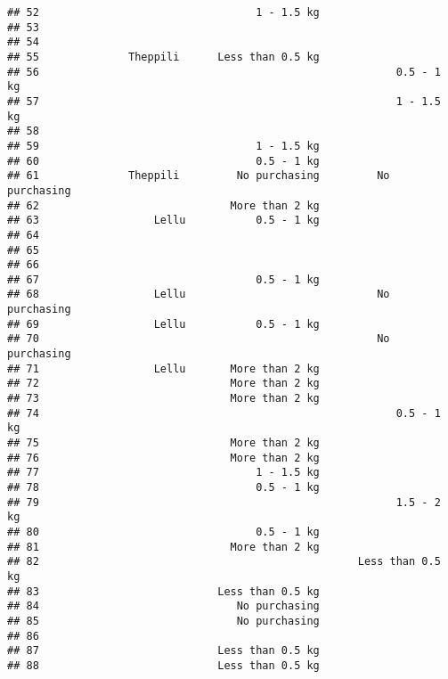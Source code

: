 \documentclass[
]{article}
\begin{document}
\begin{verbatim}
## 52                                  1 - 1.5 kg                      
## 53                                                                  
## 54                                                                  
## 55              Theppili      Less than 0.5 kg                      
## 56                                                        0.5 - 1 kg
## 57                                                        1 - 1.5 kg
## 58                                                                  
## 59                                  1 - 1.5 kg                      
## 60                                  0.5 - 1 kg                      
## 61              Theppili         No purchasing         No purchasing
## 62                              More than 2 kg                      
## 63                  Lellu           0.5 - 1 kg                      
## 64                                                                  
## 65                                                                  
## 66                                                                  
## 67                                  0.5 - 1 kg                      
## 68                  Lellu                              No purchasing
## 69                  Lellu           0.5 - 1 kg                      
## 70                                                     No purchasing
## 71                  Lellu       More than 2 kg                      
## 72                              More than 2 kg                      
## 73                              More than 2 kg                      
## 74                                                        0.5 - 1 kg
## 75                              More than 2 kg                      
## 76                              More than 2 kg                      
## 77                                  1 - 1.5 kg                      
## 78                                  0.5 - 1 kg                      
## 79                                                        1.5 - 2 kg
## 80                                  0.5 - 1 kg                      
## 81                              More than 2 kg                      
## 82                                                  Less than 0.5 kg
## 83                            Less than 0.5 kg                      
## 84                               No purchasing                      
## 85                               No purchasing                      
## 86                                                                  
## 87                            Less than 0.5 kg                      
## 88                            Less than 0.5 kg                      

\end{verbatim}
\end{document}
